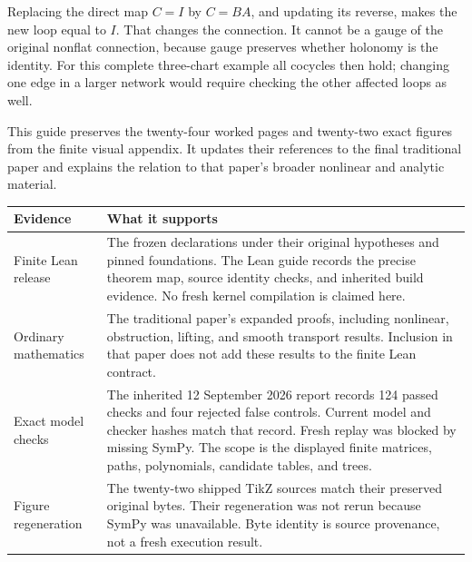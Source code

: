 Replacing the direct map $C=I$ by $C=BA$, and updating its reverse, makes the new loop equal to $I$. That changes the connection. It cannot be a gauge of the original nonflat connection, because gauge preserves whether holonomy is the identity. For this complete three-chart example all cocycles then hold; changing one edge in a larger network would require checking the other affected loops as well.


This guide preserves the twenty-four worked pages and twenty-two exact figures from the finite visual appendix. It updates their references to the final traditional paper and explains the relation to that paper's broader nonlinear and analytic material.

{\small
\begin{tabularx}{\linewidth}{@{}p{.24\linewidth}Y@{}}\toprule
\textbf{Evidence} & \textbf{What it supports}\\\midrule
Finite Lean release & The frozen declarations under their original hypotheses and pinned foundations. The Lean guide records the precise theorem map, source identity checks, and inherited build evidence. No fresh kernel compilation is claimed here.\\
Ordinary mathematics & The traditional paper's expanded proofs, including nonlinear, obstruction, lifting, and smooth transport results. Inclusion in that paper does not add these results to the finite Lean contract.\\
Exact model checks & The inherited 12 September 2026 report records 124 passed checks and four rejected false controls. Current model and checker hashes match that record. Fresh replay was blocked by missing SymPy. The scope is the displayed finite matrices, paths, polynomials, candidate tables, and trees.\\
Figure regeneration & The twenty-two shipped TikZ sources match their preserved original bytes. Their regeneration was not rerun because SymPy was unavailable. Byte identity is source provenance, not a fresh execution result.\\\bottomrule
\end{tabularx}}

